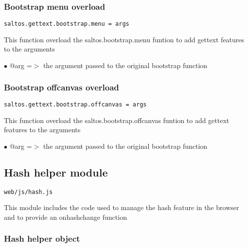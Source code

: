 \documentclass[a4paper]{article}
\begin{document}
\hypertarget{toc805}{}
\subsubsection{Bootstrap menu overload}

\begin{lstlisting}
saltos.gettext.bootstrap.menu = args
\end{lstlisting}

This function overload the saltos.bootstrap.menu funtion to add gettext
features to the arguments

\begin{compactitem}
\item[\color{myblue}$\bullet$] @arg =$>$ the argument passed to the original bootstrap function
\end{compactitem}

\hypertarget{toc806}{}
\subsubsection{Bootstrap offcanvas overload}

\begin{lstlisting}
saltos.gettext.bootstrap.offcanvas = args
\end{lstlisting}

This function overload the saltos.bootstrap.offcanvas funtion to add gettext
features to the arguments

\begin{compactitem}
\item[\color{myblue}$\bullet$] @arg =$>$ the argument passed to the original bootstrap function
\end{compactitem}

\hypertarget{toc807}{}
\subsection{Hash helper module}

\begin{lstlisting}
web/js/hash.js
\end{lstlisting}

This module includes the code used to manage the hash feature in the browser
and to provide an onhashchange function

\hypertarget{toc808}{}
\subsubsection{Hash helper object}
\end{document}
